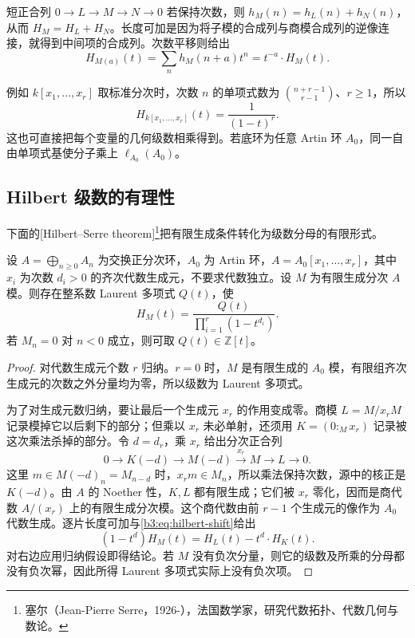 短正合列 \(0\rightarrow L\rightarrow M\rightarrow N\rightarrow0\) 若保持次数，则 \(h_M(n)=h_L(n)+h_N(n)\)，从而 \(H_M=H_L+H_N\)。长度可加是因为将子模的合成列与商模合成列的逆像连接，就得到中间项的合成列。次数平移则给出
\begin{equation}\label{b3:eq:hilbert-shift}
	H_{M(a)}(t)=\sum_n h_M(n+a)t^n=t^{-a}\cdot H_M(t).
\end{equation}

例如 \(k[x_1,\ldots,x_r]\) 取标准分次时，次数 \(n\) 的单项式数为 \(\binom{n+r-1}{r-1}\)、\(r\ge1\)，所以
\[
	H_{k[x_1,\ldots,x_r]}(t)=\dfrac1{(1-t)^r}.
\]
这也可直接把每个变量的几何级数相乘得到。若底环为任意 Artin 环 \(A_0\)，同一自由单项式基使分子乘上 \(\ell_{A_0}(A_0)\)。

\subsection{Hilbert 级数的有理性}
\label{b3:subsec:1102:02}

下面的[Hilbert--Serre theorem]\footnote{塞尔（Jean-Pierre Serre，1926-），法国数学家，研究代数拓扑、代数几何与数论。}把有限生成条件转化为级数分母的有限形式。

\begin{theorem}\label{b3:thm:hilbert-serre}
	设 \(A=\bigoplus_{n\ge0}A_n\) 为交换正分次环，\(A_0\) 为 Artin 环，\(A=A_0[x_1,\ldots,x_r]\)，其中 \(x_i\) 为次数 \(d_i>0\) 的齐次代数生成元，不要求代数独立。设 \(M\) 为有限生成分次 \(A\) 模。则存在整系数 Laurent 多项式 \(Q(t)\)，使
	\[
		H_M(t)=\dfrac{Q(t)}{\prod_{i=1}^r(1-t^{d_i})}.
	\]
	若 \(M_n=0\) 对 \(n<0\) 成立，则可取 \(Q(t)\in\mathbb Z[t]\)。
\end{theorem}
\begin{proof}
	对代数生成元个数 \(r\) 归纳。\(r=0\) 时，\(M\) 是有限生成的 \(A_0\) 模，有限组齐次生成元的次数之外分量均为零，所以级数为 Laurent 多项式。

	为了对生成元数归纳，要让最后一个生成元 \(x_r\) 的作用变成零。商模 \(L=M/x_rM\) 记录模掉它以后剩下的部分；但乘以 \(x_r\) 未必单射，还须用 \(K=(0:_Mx_r)\) 记录被这次乘法杀掉的部分。令 \(d=d_r\)，乘 \(x_r\) 给出分次正合列
	\[
		0\longrightarrow K(-d)\longrightarrow M(-d) \xrightarrow{\ x_r\ }M\longrightarrow L\longrightarrow0.
	\]
	这里 \(m\in M(-d)_n=M_{n-d}\) 时，\(x_rm\in M_n\)，所以乘法保持次数，源中的核正是 \(K(-d)\)。由 \(A\) 的 Noether 性，\(K,L\) 都有限生成；它们被 \(x_r\) 零化，因而是商代数 \(A/(x_r)\) 上的有限生成分次模。这个商代数由前 \(r-1\) 个生成元的像作为 \(A_0\) 代数生成。逐片长度可加与\eqref{b3:eq:hilbert-shift}给出
	\begin{equation}\label{b3:eq:hilbert-induction}
		(1-t^d)H_M(t)=H_L(t)-t^d\cdot H_K(t).
	\end{equation}
	对右边应用归纳假设即得结论。若 \(M\) 没有负次分量，则它的级数及所乘的分母都没有负次幂，因此所得 Laurent 多项式实际上没有负次项。
\end{proof}

